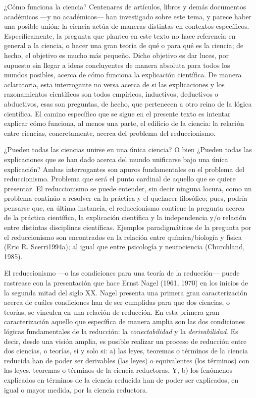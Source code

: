 \documentclass[]{book}
\begin{document}
¿Cómo funciona la ciencia? Centenares de artículos, libros y demás
documentos académicos ---y no académicos--- han investigado sobre este
tema, y parece haber una posible unión: la ciencia actúa de maneras
distintas en contextos específicos. Específicamente, la pregunta que
planteo en este texto no hace referencia en general a la ciencia, o
hacer una gran teoría de qué o para qué es la ciencia; de hecho, el
objetivo es mucho más pequeño. Dicho objetivo es dar luces, por supuesto
sin llegar a ideas concluyentes de manera absoluta para todos los mundos
posibles, acerca de cómo funciona la explicación científica. De manera
aclaratoria, esta interrogante no versa acerca de si las explicaciones y
los razonamientos científicos son todos empíricos, inductivos,
deductivos o abductivos, esas son preguntas, de hecho, que pertenecen a
otro reino de la lógica científica. El camino específico que se sigue en
el presente texto es intentar explicar cómo funciona, al menos una
parte, el edificio de la ciencia: la relación entre ciencias,
concretamente, acerca del problema del reduccionismo.

¿Pueden todas las ciencias unirse en una única ciencia? O bien ¿Pueden
todas las explicaciones que se han dado acerca del mundo unificarse bajo
una única explicación? Ambas interrogantes son apuros fundamentales en
el problema del reduccionismo. Problema que será el punto cardinal de
aquello que se quiere presentar. El reduccionismo se puede entender, sin
decir ninguna locura, como un problema continúo a resolver en la
práctica y el quehacer filosófico; pues, podría pensarse que, en última
instancia, el reduccionismo contiene la pregunta acerca de la práctica
científica, la explicación científica y la independencia y/o relación
entre distintas disciplinas científicas. Ejemplos paradigmáticos de la
pregunta por el reduccionismo son encontrados en la relación entre
química/biología y física (Eric R. Scerri1994a); al igual que entre
psicología y neurociencia (Churchland, 1985).

El reduccionismo ---o las condiciones para una teoría de la reducción---
puede rastrease con la presentación que hace Ernst Nagel (1961, 1970) en
los inicios de la segunda mitad del siglo XX. Nagel presenta una primera
gran caracterización acerca de cuáles condiciones han de ser cumplidas
para que dos ciencias, o teorías, se vinculen en una relación de
reducción. En esta primera gran caracterización aquello que específica
de manera amplia son las dos condiciones lógicas fundamentales de la
reducción: la \emph{conectabilidad} y la \emph{derivabilidad}. Es decir,
desde una visión amplia, es posible realizar un proceso de reducción
entre dos ciencias, o teorías, si y solo si: a) las leyes, teoremas o
términos de la ciencia reducida han de poder ser derivables (las leyes)
o equivalentes (los términos) con las leyes, teoremas o términos de la
ciencia reductoras. Y, b) los fenómenos explicados en términos de la
ciencia reducida han de poder ser explicados, en igual o mayor medida,
por la ciencia reductora.
\end{document}
